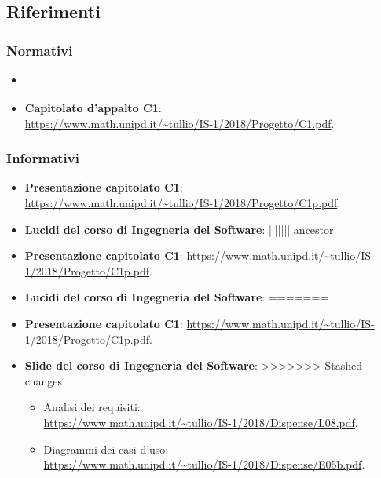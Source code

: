 	\subsection{Riferimenti}

	\subsubsection{Normativi}
	\begin{itemize}
		\item \textbf{\textit{\NdPv}}
		\item \textbf{Capitolato d'appalto C1}:\\ \url{https://www.math.unipd.it/~tullio/IS-1/2018/Progetto/C1.pdf}.
	\end{itemize}

	\subsubsection{Informativi}
	\begin{itemize}
<<<<<<< Updated upstream
		\item \textbf{Presentazione capitolato C1}:\\ \url{https://www.math.unipd.it/~tullio/IS-1/2018/Progetto/C1p.pdf}.
		\item \textbf{Lucidi del corso di Ingegneria del Software}:
||||||| ancestor
		\item \textbf{Presentazione capitolato C1}: \url{https://www.math.unipd.it/~tullio/IS-1/2018/Progetto/C1p.pdf}.
		\item \textbf{Lucidi del corso di Ingegneria del Software}:
=======
		\item \textbf{Presentazione capitolato C1}: \url{https://www.math.unipd.it/~tullio/IS-1/2018/Progetto/C1p.pdf}.
		\item \textbf{Slide del corso di Ingegneria del Software}:
>>>>>>> Stashed changes
		
		\begin{itemize}
			\item Analisi dei requisiti:\\ \url{https://www.math.unipd.it/~tullio/IS-1/2018/Dispense/L08.pdf}.
			\item Diagrammi dei casi d'uso:\\ \url{https://www.math.unipd.it/~tullio/IS-1/2018/Dispense/E05b.pdf}.
		\end{itemize}
	\end{itemize}